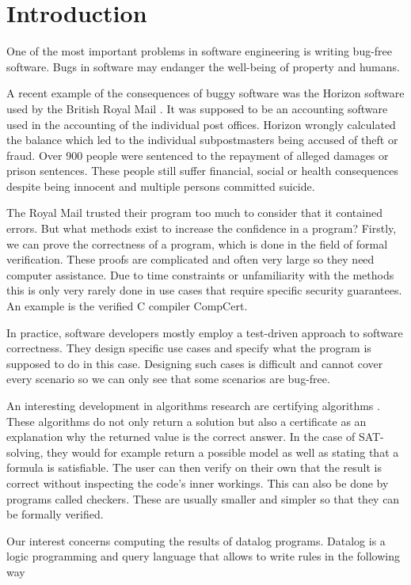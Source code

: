 \section{Introduction}

One of the most important problems in software engineering is writing bug-free software.  Bugs in software may endanger the well-being of property and humans.

A recent example of the consequences of buggy software was the Horizon software used by the British Royal Mail \cite{horizonRoyalMail}. It was supposed to be an accounting software used in the accounting of the individual post offices. Horizon wrongly calculated the balance which led to the individual subpostmasters being accused of theft or fraud. Over 900 people were sentenced to the repayment of alleged damages or prison sentences. These people still suffer financial, social or health consequences despite being innocent and multiple persons committed suicide.

The Royal Mail trusted their program too much to consider that it contained errors. But what methods exist to increase the confidence in a program?
Firstly, we can prove the correctness of a program, which is done in the field of formal verification. These proofs are complicated and often very large so they need computer assistance. Due to time constraints or unfamiliarity with the methods this is only very rarely done in use cases that require specific security guarantees. An example is the verified C compiler CompCert\cite{CCertComp}.

In practice, software developers mostly employ a test-driven approach to software correctness. They design specific use cases and specify what the program is supposed to do in this case. Designing such cases is difficult and cannot cover every scenario so we can only see that some scenarios are bug-free.

An interesting development in algorithms research are certifying algorithms \cite{CertAlg}. These algorithms do not only return a solution but also a certificate as an explanation why the returned value is the correct answer. In the case of SAT-solving, they would for example return a possible model as well as stating that a formula is satisfiable. The user can then verify on their own that the result is correct without inspecting the code's inner workings. This can also be done by programs called checkers. These are usually smaller and simpler so that they can be formally verified. 

Our interest concerns computing the results of datalog programs. Datalog is a logic programming and query language that allows to write rules in the following way

